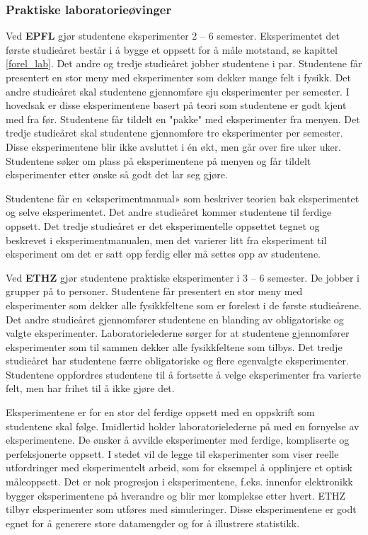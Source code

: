\documentclass{article}
\begin{document}
\subsubsection{Praktiske laboratorieøvinger}
Ved \textbf{EPFL} gjør studentene eksperimenter 2 – 6 semester. Eksperimentet det første studieåret består i å bygge et oppsett for å måle motstand, se kapittel \ref{forel_lab}. Det andre og tredje studieåret jobber studentene i par. Studentene får presentert en stor meny med eksperimenter som dekker mange felt i fysikk. Det andre studieåret skal studentene gjennomføre sju eksperimenter per semester. I hovedsak er disse eksperimentene basert på teori som studentene er godt kjent med fra før. Studentene får tildelt en "pakke" med eksperimenter fra menyen. Det tredje studieåret skal studentene gjennomføre tre eksperimenter per semester. Disse eksperimentene blir ikke avsluttet i én økt, men går over fire uker uker. Studentene søker om plass på eksperimentene på menyen og får tildelt eksperimenter etter ønske så godt det lar seg gjøre. 
 
Studentene får en «eksperimentmanual» som beskriver teorien bak eksperimentet og selve eksperimentet. Det andre studieåret kommer studentene til ferdige oppsett. Det tredje studieåret er det eksperimentelle oppsettet tegnet og beskrevet i eksperimentmanualen, men det varierer litt fra eksperiment til eksperiment om det er satt opp ferdig eller må settes opp av studentene. 

Ved \textbf{ETHZ} gjør studentene praktiske eksperimenter i 3 – 6 semester. De jobber i grupper på to personer. Studentene får presentert en stor meny med eksperimenter som dekker alle fysikkfeltene som er forelest i de første studieårene. Det andre studieåret gjennomfører studentene en blanding av obligatoriske og valgte eksperimenter. Laboratorielederne sørger for at studentene gjennomfører eksperimenter som til sammen dekker alle fysikkfeltene som tilbys.  Det tredje studieåret har studentene færre obligatoriske og flere egenvalgte eksperimenter. Studentene oppfordres studentene til å fortsette å velge eksperimenter fra varierte felt, men har frihet til å ikke gjøre det.

Eksperimentene er for en stor del ferdige oppsett med en oppskrift som studentene skal følge. Imidlertid holder laboratorielederne på med en fornyelse av eksperimentene. De ønsker å avvikle eksperimenter med ferdige, kompliserte og perfeksjonerte oppsett. I stedet vil de legge til eksperimenter som viser reelle utfordringer med eksperimentelt arbeid, som for eksempel å opplinjere et optisk måleoppsett. Det er nok progresjon i eksperimentene, f.eks. innenfor elektronikk bygger eksperimentene på hverandre og blir mer komplekse etter hvert. ETHZ tilbyr eksperimenter som utføres med simuleringer. Disse eksperimentene er godt egnet for å generere store datamengder og for å illustrere statistikk. 
\end{document}

